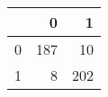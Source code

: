 \begin{tabular}{lrr}
\toprule
{} &    0 &    1 \\
\midrule
0 &  187 &   10 \\
1 &    8 &  202 \\
\bottomrule
\end{tabular}
